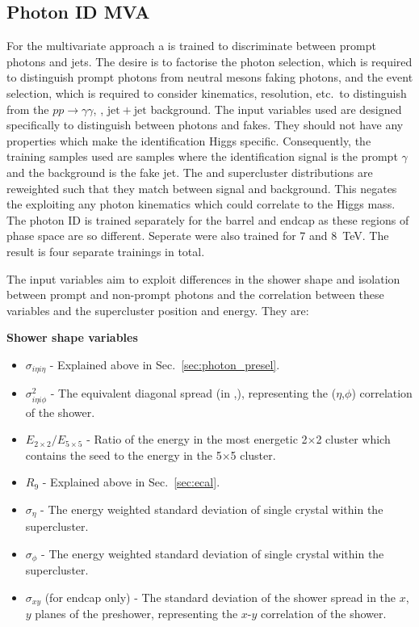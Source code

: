 \subsection{Photon ID MVA}
\label{sec:pho_id_mva}

For the multivariate approach a \BDT is trained to discriminate between prompt photons and jets. The desire is to factorise the photon selection, which is required to distinguish prompt photons from neutral mesons faking photons, and the event selection, which is required to consider kinematics, resolution, etc.~to distinguish \Hgg from the $pp\rightarrow\gamma\gamma$, \gjet, $\mathrm{jet}+\mathrm{jet}$ background. The input variables used are designed specifically to distinguish between photons and fakes. They should not have any properties which make the identification Higgs specific. Consequently, the training samples used are \gjet samples where the identification \BDT signal is the prompt $\gamma$ and the background is the fake jet. The \pT and supercluster \eta distributions are reweighted such that they match between signal and background. This negates the \BDT exploiting any photon kinematics which could correlate to the Higgs mass. The photon ID \BDT is trained separately for the barrel and endcap as these regions of phase space are so different. Seperate \BDTs were also trained for 7 and 8~TeV. The result is four separate trainings in total.

The input variables aim to exploit differences in the shower shape and isolation between prompt and non-prompt photons and the correlation between these variables and the supercluster position and energy. They are:

\noindent\textbf{Shower shape variables}
\begin{itemize}
  \item $\sigma_{i\eta i\eta}$ - Explained above in Sec.~\ref{sec:photon_presel}.
  \item $\sigma^{2}_{i\eta i\phi}$ - The equivalent diagonal spread (in \eta,\phi), representing the ($\eta$,$\phi$) correlation of the shower.
  \item $E_{2\times2}/E_{5\times5}$ - Ratio of the energy in the most energetic 2$\times$2 cluster which contains the seed to the energy in the 5$\times$5 cluster.
  \item $R_{9}$ - Explained above in Sec.~\ref{sec:ecal}.
  \item $\sigma_{\eta}$ - The energy weighted standard deviation of single crystal \eta within the supercluster.
  \item $\sigma_{\phi}$ - The energy weighted standard deviation of single crystal \phi within the supercluster.
  \item $\sigma_{xy}$ (for endcap only) - The standard deviation of the shower spread in the $x$, $y$ planes of the preshower, representing the $x$-$y$ correlation of the shower.
\end{itemize}

